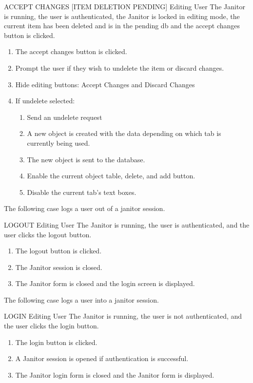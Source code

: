 \begin{usecase}
  {ACCEPT CHANGES [ITEM DELETION PENDING]}
  {Editing User}
  {The Janitor is running, the user is authenticated,  the Janitor is locked in editing mode, the current item has been deleted and is in the pending db and the accept changes button is clicked.}
\begin{enumerate}
\item The accept changes button is clicked.
\item Prompt the user if they wish to undelete the item or discard changes.
\item Hide editing buttons: Accept Changes and Discard Changes
\item If undelete selected:
  \begin{enumerate}
  \item Send an undelete request
  \item A new object is created with the data depending on which tab is currently being used.
  \item The new object is sent to the database.
  \item Enable the current object table, delete, and add button.
  \item Disable the current tab's text boxes.
  \end{enumerate}
\end{enumerate}
\end{usecase}

The following case logs a user out of a janitor session.

\begin{usecase}
  {LOGOUT}
  {Editing User}
  {The Janitor is running, the user is authenticated,  and the user clicks the logout button.
}
\begin{enumerate}
\item The logout button is clicked.
\item The Janitor session is closed.
\item The Janitor form is closed and the login screen is displayed.
\end{enumerate}
\end{usecase}

The following case logs a user into a janitor session.

\begin{usecase}
  {LOGIN}
  {Editing User}
  {The Janitor is running, the user is not authenticated,  and the user clicks the login button.}
\begin{enumerate}
\item The login button is clicked.
\item A Janitor session is opened if authentication is successful.
\item The Janitor login form is closed and the Janitor form is displayed.
\end{enumerate}
\end{usecase}

